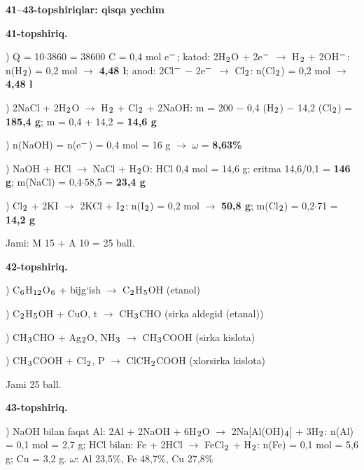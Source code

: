 \documentclass[11pt,a4paper]{article}
\renewcommand{\textsubscript}[1]{\ensuremath{_{\text{\fontsize{8}{8}\selectfont #1}}}}
\renewcommand{\textsuperscript}[1]{\ensuremath{^{\text{\fontsize{8}{8}\selectfont #1}}}}
\begin{document}
\noindent\textbf{41--43-topshiriqlar: qisqa yechim}\par\smallskip
\noindent\textbf{41-topshiriq.}\par
{}) Q = 10$\cdot$3860 = 38600 C = 0,4 mol e\textsuperscript{$-$}; katod: 2H\textsubscript{2}O + 2e\textsuperscript{$-$} $\to$ H\textsubscript{2} + 2OH\textsuperscript{$-$}: n(H\textsubscript{2}) = 0,2 mol $\to$ \textbf{4,48 l}; anod: 2Cl\textsuperscript{$-$} $-$ 2e\textsuperscript{$-$} $\to$ Cl\textsubscript{2}: n(Cl\textsubscript{2}) = 0,2 mol $\to$ \textbf{4,48 l}\par
{}) 2NaCl + 2H\textsubscript{2}O $\to$ H\textsubscript{2} + Cl\textsubscript{2} + 2NaOH: m = 200 $-$ 0,4 (H\textsubscript{2}) $-$ 14,2 (Cl\textsubscript{2}) = \textbf{185,4 g}; m = 0,4 + 14,2 = \textbf{14,6 g}\par
{}) n(NaOH) = n(e\textsuperscript{$-$}) = 0,4 mol = 16 g $\to$ $\omega$ = \textbf{8,63\%}\par
{}) NaOH + HCl $\to$ NaCl + H\textsubscript{2}O: HCl 0,4 mol = 14,6 g; eritma 14,6/0,1 = \textbf{146 g}; m(NaCl) = 0,4$\cdot$58,5 = \textbf{23,4 g}\par
{}) Cl\textsubscript{2} + 2KI $\to$ 2KCl + I\textsubscript{2}: n(I\textsubscript{2}) = 0,2 mol $\to$ \textbf{50,8 g}; m(Cl\textsubscript{2}) = 0,2$\cdot$71 = \textbf{14,2 g}\par
\noindent Jami: M 15 + A 10 = 25 ball.\par
\noindent\textbf{42-topshiriq.}\par
{}) C\textsubscript{6}H\textsubscript{12}O\textsubscript{6} + bijg`ish $\to$ C\textsubscript{2}H\textsubscript{5}OH (etanol)\par
{}) C\textsubscript{2}H\textsubscript{5}OH + CuO, t\textdegree{} $\to$ CH\textsubscript{3}CHO (sirka aldegid (etanal))\par
{}) CH\textsubscript{3}CHO + Ag\textsubscript{2}O, NH\textsubscript{3} $\to$ CH\textsubscript{3}COOH (sirka kislota)\par
{}) CH\textsubscript{3}COOH + Cl\textsubscript{2}, P $\to$ ClCH\textsubscript{2}COOH (xlorsirka kislota)\par
\noindent Jami 25 ball.\par
\noindent\textbf{43-topshiriq.}\par
{}) NaOH bilan faqat Al: 2Al + 2NaOH + 6H\textsubscript{2}O $\to$ 2Na[Al(OH)\textsubscript{4}] + 3H\textsubscript{2}: n(Al) = 0,1 mol = 2,7 g; HCl bilan: Fe + 2HCl $\to$ FeCl\textsubscript{2} + H\textsubscript{2}: n(Fe) = 0,1 mol = 5,6 g; Cu = 3,2 g. $\omega$: Al 23,5\%, Fe 48,7\%, Cu 27,8\%\par
\end{document}
